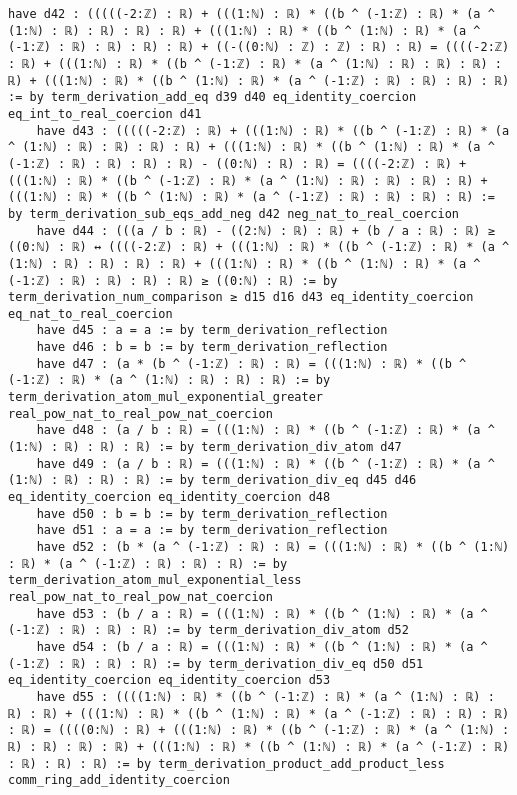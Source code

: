 \documentclass{article}
\begin{document}
\begin{tcolorbox}[colback=white!10, width=\linewidth]
\begin{lstlisting}[language=Lean4]
    have d42 : (((((-2:ℤ) : ℝ) + (((1:ℕ) : ℝ) * ((b ^ (-1:ℤ) : ℝ) * (a ^ (1:ℕ) : ℝ) : ℝ) : ℝ) : ℝ) + (((1:ℕ) : ℝ) * ((b ^ (1:ℕ) : ℝ) * (a ^ (-1:ℤ) : ℝ) : ℝ) : ℝ) : ℝ) + ((-((0:ℕ) : ℤ) : ℤ) : ℝ) : ℝ) = ((((-2:ℤ) : ℝ) + (((1:ℕ) : ℝ) * ((b ^ (-1:ℤ) : ℝ) * (a ^ (1:ℕ) : ℝ) : ℝ) : ℝ) : ℝ) + (((1:ℕ) : ℝ) * ((b ^ (1:ℕ) : ℝ) * (a ^ (-1:ℤ) : ℝ) : ℝ) : ℝ) : ℝ) := by term_derivation_add_eq d39 d40 eq_identity_coercion eq_int_to_real_coercion d41
    have d43 : (((((-2:ℤ) : ℝ) + (((1:ℕ) : ℝ) * ((b ^ (-1:ℤ) : ℝ) * (a ^ (1:ℕ) : ℝ) : ℝ) : ℝ) : ℝ) + (((1:ℕ) : ℝ) * ((b ^ (1:ℕ) : ℝ) * (a ^ (-1:ℤ) : ℝ) : ℝ) : ℝ) : ℝ) - ((0:ℕ) : ℝ) : ℝ) = ((((-2:ℤ) : ℝ) + (((1:ℕ) : ℝ) * ((b ^ (-1:ℤ) : ℝ) * (a ^ (1:ℕ) : ℝ) : ℝ) : ℝ) : ℝ) + (((1:ℕ) : ℝ) * ((b ^ (1:ℕ) : ℝ) * (a ^ (-1:ℤ) : ℝ) : ℝ) : ℝ) : ℝ) := by term_derivation_sub_eqs_add_neg d42 neg_nat_to_real_coercion
    have d44 : (((a / b : ℝ) - ((2:ℕ) : ℝ) : ℝ) + (b / a : ℝ) : ℝ) ≥ ((0:ℕ) : ℝ) ↔ ((((-2:ℤ) : ℝ) + (((1:ℕ) : ℝ) * ((b ^ (-1:ℤ) : ℝ) * (a ^ (1:ℕ) : ℝ) : ℝ) : ℝ) : ℝ) + (((1:ℕ) : ℝ) * ((b ^ (1:ℕ) : ℝ) * (a ^ (-1:ℤ) : ℝ) : ℝ) : ℝ) : ℝ) ≥ ((0:ℕ) : ℝ) := by term_derivation_num_comparison ≥ d15 d16 d43 eq_identity_coercion eq_nat_to_real_coercion
    have d45 : a = a := by term_derivation_reflection
    have d46 : b = b := by term_derivation_reflection
    have d47 : (a * (b ^ (-1:ℤ) : ℝ) : ℝ) = (((1:ℕ) : ℝ) * ((b ^ (-1:ℤ) : ℝ) * (a ^ (1:ℕ) : ℝ) : ℝ) : ℝ) := by term_derivation_atom_mul_exponential_greater real_pow_nat_to_real_pow_nat_coercion
    have d48 : (a / b : ℝ) = (((1:ℕ) : ℝ) * ((b ^ (-1:ℤ) : ℝ) * (a ^ (1:ℕ) : ℝ) : ℝ) : ℝ) := by term_derivation_div_atom d47
    have d49 : (a / b : ℝ) = (((1:ℕ) : ℝ) * ((b ^ (-1:ℤ) : ℝ) * (a ^ (1:ℕ) : ℝ) : ℝ) : ℝ) := by term_derivation_div_eq d45 d46 eq_identity_coercion eq_identity_coercion d48
    have d50 : b = b := by term_derivation_reflection
    have d51 : a = a := by term_derivation_reflection
    have d52 : (b * (a ^ (-1:ℤ) : ℝ) : ℝ) = (((1:ℕ) : ℝ) * ((b ^ (1:ℕ) : ℝ) * (a ^ (-1:ℤ) : ℝ) : ℝ) : ℝ) := by term_derivation_atom_mul_exponential_less real_pow_nat_to_real_pow_nat_coercion
    have d53 : (b / a : ℝ) = (((1:ℕ) : ℝ) * ((b ^ (1:ℕ) : ℝ) * (a ^ (-1:ℤ) : ℝ) : ℝ) : ℝ) := by term_derivation_div_atom d52
    have d54 : (b / a : ℝ) = (((1:ℕ) : ℝ) * ((b ^ (1:ℕ) : ℝ) * (a ^ (-1:ℤ) : ℝ) : ℝ) : ℝ) := by term_derivation_div_eq d50 d51 eq_identity_coercion eq_identity_coercion d53
    have d55 : ((((1:ℕ) : ℝ) * ((b ^ (-1:ℤ) : ℝ) * (a ^ (1:ℕ) : ℝ) : ℝ) : ℝ) + (((1:ℕ) : ℝ) * ((b ^ (1:ℕ) : ℝ) * (a ^ (-1:ℤ) : ℝ) : ℝ) : ℝ) : ℝ) = ((((0:ℕ) : ℝ) + (((1:ℕ) : ℝ) * ((b ^ (-1:ℤ) : ℝ) * (a ^ (1:ℕ) : ℝ) : ℝ) : ℝ) : ℝ) + (((1:ℕ) : ℝ) * ((b ^ (1:ℕ) : ℝ) * (a ^ (-1:ℤ) : ℝ) : ℝ) : ℝ) : ℝ) := by term_derivation_product_add_product_less comm_ring_add_identity_coercion

\end{lstlisting}
\end{tcolorbox}
\end{document}

